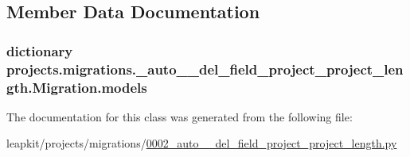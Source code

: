 \subsection{Member Data Documentation}
\hypertarget{classprojects_1_1migrations_1_10002__auto____del__field__project__project__length_1_1_migration_a66226def0e035b84e7a51a6b4cc33954}{
\subsubsection[{models}]{\setlength{\rightskip}{0pt plus 5cm}dictionary projects.\-migrations.\-\_\-auto\-\_\-\-\_\-del\-\_\-field\-\_\-project\-\_\-project\-\_\-length.\-Migration.\-models\hspace{0.3cm}{\ttfamily [static]}}}\label{classprojects_1_1migrations_1_10002__auto____del__field__project__project__length_1_1_migration_a66226def0e035b84e7a51a6b4cc33954}


The documentation for this class was generated from the following file\-:\begin{DoxyCompactItemize}
\item 
leapkit/projects/migrations/\hyperlink{0002__auto____del__field__project__project__length_8py}{0002\-\_\-auto\-\_\-\-\_\-del\-\_\-field\-\_\-project\-\_\-project\-\_\-length.\-py}\end{DoxyCompactItemize}
